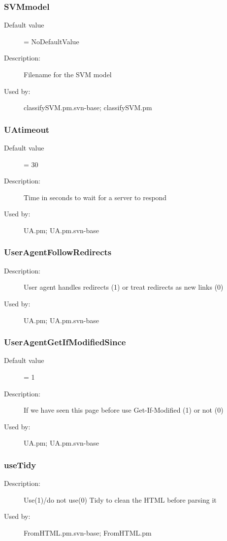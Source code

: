 \subsubsection{SVMmodel}
\label{SVMmodel}
\begin{description}
\item[Default value] = NoDefaultValue
\item[Description:] Filename for the SVM model
\item[Used by:] classifySVM.pm.svn-base; classifySVM.pm
\end{description}
\subsubsection{UAtimeout}
\label{UAtimeout}
\begin{description}
\item[Default value] = 30
\item[Description:] Time in seconds to wait for a server to respond
\item[Used by:] UA.pm; UA.pm.svn-base
\end{description}
\subsubsection{UserAgentFollowRedirects}
\label{UserAgentFollowRedirects}
\begin{description}
\item[Description:] User agent handles redirects (1) or treat redirects as new links (0)
\item[Used by:] UA.pm; UA.pm.svn-base
\end{description}
\subsubsection{UserAgentGetIfModifiedSince}
\label{UserAgentGetIfModifiedSince}
\begin{description}
\item[Default value] = 1
\item[Description:] If we have seen this page before use Get-If-Modified (1) or not (0)
\item[Used by:] UA.pm; UA.pm.svn-base
\end{description}
\subsubsection{useTidy}
\label{useTidy}
\begin{description}
\item[Description:] Use(1)/do not use(0) Tidy to clean the HTML before parsing it
\item[Used by:] FromHTML.pm.svn-base; FromHTML.pm
\end{description}
